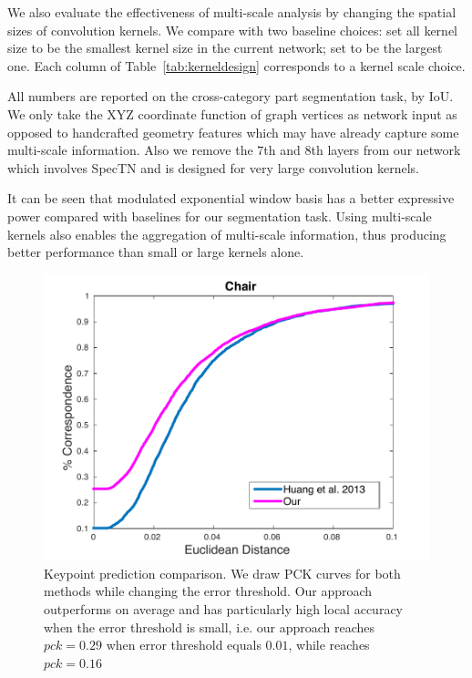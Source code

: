 We also evaluate the effectiveness of multi-scale analysis by changing the spatial sizes of convolution kernels. We compare with two baseline choices: set all kernel size to be the smallest kernel size in the current network; set to be the largest one. Each column of Table~\ref{tab:kerneldesign} corresponds to a kernel scale choice.
 
All numbers are reported on the cross-category part segmentation task, by IoU. We only take the XYZ coordinate function of graph vertices as network input as opposed to handcrafted geometry features which may have already capture some multi-scale information. Also we remove the $7$th and $8$th layers from our network which involves SpecTN and is designed for very large convolution kernels. 

It can be seen that modulated exponential window basis has a better expressive power compared with baselines for our segmentation task. Using multi-scale kernels also enables the aggregation of multi-scale information, thus producing better performance than small or large kernels alone. 
\begin{figure}[t!]
    \centering
    \includegraphics[width=0.8\linewidth]{./fig/kpt_pred_chair.pdf}
    \caption{Keypoint prediction comparison. We draw PCK curves for both methods while changing the error threshold. Our approach outperforms \cite{huang2013fine} on average and has particularly high local accuracy when the error threshold is small, i.e. our approach reaches $pck=0.29$ when error threshold equals $0.01$, while \cite{huang2013fine} reaches $pck=0.16$}
    \label{fig:keypoint}
    \vspace{-0.5cm}
\end{figure}


